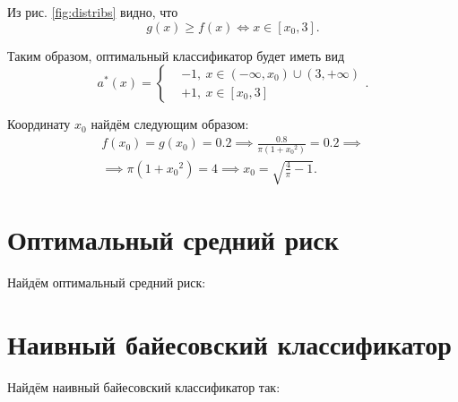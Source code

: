 \documentclass[14pt,a4paper]{article}
\begin{document}
	Из рис. \ref{fig:distribs} видно, что
	\[
		g(x) \geq f(x) \iff x \in [x_0, 3].
	\]
	
	Таким образом, оптимальный классификатор будет иметь вид
	\[
		a^*(x) = \left\{
		\begin{aligned}
			& -1, \ x \in (-\infty, x_0) \cup (3, +\infty) \\
			& +1, \ x \in [x_0, 3]
		\end{aligned}
		\right..
	\]
	
	Координату $x_0$ найдём следующим образом:
	\[
	\begin{gathered}
		f(x_0) = g(x_0) = 0.2 \implies \frac{0.8}{\pi (1 + {x_0}^2)} = 0.2 \implies \\
		\implies \pi (1 + {x_0}^2) = 4 \implies x_0 = \sqrt{\frac{4}{\pi} - 1}.
	\end{gathered}
	\]
	
    \section{Оптимальный средний риск}
    Найдём оптимальный средний риск:

    \section{Наивный байесовский классификатор}
    Найдём наивный байесовский классификатор так:
\end{document}
